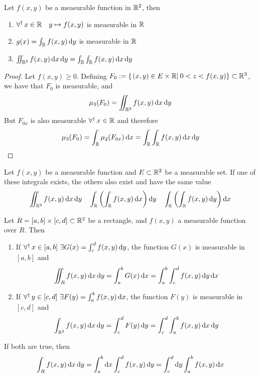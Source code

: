 \documentclass[../complete.tex]{subfiles}
\begin{document}
\begin{thm}[Fubini]
	Let $f(x,y)$ be a measurable function in $\mathbb{R}^2$, then
	\begin{enumerate}
	\item $\operatorname{\forall^\dagger} x\in\mathbb{R}\quad y\mapsto f(x,y)$ is measurable in $\mathbb{R}$
	\item $g(x)=\int_{\mathbb{R}}^{}f(x,y)\operatorname{d\!} y$ is measurable in $\mathbb{R}$
	\item $\iint_{\mathbb{R}^2}f(x,y)\operatorname{d\!} x\operatorname{d\!} y=\int_{\mathbb{R}}^{}\int_{\mathbb{R}}^{}f(x,y)\operatorname{d\!} x\operatorname{d\!} y$
	\end{enumerate}
\end{thm}
\begin{proof}
	Let $f(x,y)\ge0$. Defining $F_0:=\left\{ \left.(x,y)\in E\times\mathbb{R}\right|_{}0<z<f(x,y) \right\}\subset\mathbb{R}^3$, we have that $F_0$ is measurable, and
	\begin{equation*}
		\mu_3(F_0)=\iint_{\mathbb{R}^2}f(x,y)\operatorname{d\!} x\operatorname{d\!} y
	\end{equation*}
	But $F_{0x}$ is also measurable $\operatorname{\forall^\dagger} x\in\mathbb{R}$ and therefore
	\begin{equation*}
		\mu_3(F_0)=\int_{\mathbb{R}}\mu_2(F_{0x})\operatorname{d\!} x=\int_{\mathbb{R}}\int_{\mathbb{R}} f(x,y)\operatorname{d\!} x\operatorname{d\!} y
	\end{equation*}
\end{proof}
\begin{thm}[Tonelli]
	Let $f(x,y)$ be a measurable function and $E\subset\mathbb{R}^2$ be a measurable set. If one of these integrals exists, the others also exist and have the same value
	\begin{equation*}
		\iint_{\mathbb{R}^2}^{}f(x,y)\operatorname{d\!} x\operatorname{d\!} y\quad\int_{\mathbb{R}}^{}\left( \int_{\mathbb{R}}^{}f(x,y)\operatorname{d\!} x \right)\operatorname{d\!} y\quad\int_{\mathbb{R}}^{}\left( \int_{\mathbb{R}}^{}f(x,y)\operatorname{d\!} y \right)\operatorname{d\!} x
	\end{equation*}
\end{thm}
\begin{thm}
	Let $R=[a,b]\times[c,d]\subset\mathbb{R}^2$ be a rectangle, and $f(x,y)$ a measurable function over $R$. Then\\
	\begin{enumerate}
	\item If $\operatorname{\forall^\dagger} x\in[a,b]\ \exists G(x)=\int_{c}^{d}f(x,y)\operatorname{d\!} y$, the function $G(x)$ is measurable in $[a,b]$ and
		\begin{equation*}
			\iint_Rf(x,y)\operatorname{d\!} x\operatorname{d\!} y=\int_{a}^{b}G(x)\operatorname{d\!} x=\int_{a}^{b}\int_{c}^{d}f(x,y)\operatorname{d\!} y\operatorname{d\!} x
		\end{equation*}
	\item If $\operatorname{\forall^\dagger} y\in[c,d]\ \exists F(y)=\int_{a}^{b}f(x,y)\operatorname{d\!} x$, the function $F(y)$ is measurable in $[c,d]$ and
		\begin{equation*}
			\int_{\mathbb{R}^2}^{}f(x,y)\operatorname{d\!} x\operatorname{d\!} y=\int_{c}^{d}F(y)\operatorname{d\!} y=\int_{c}^{d}\int_{a}^{b}f(x,y)\operatorname{d\!} x\operatorname{d\!} y
		\end{equation*}
	\end{enumerate}
	If both are true, then
	\begin{equation}
		\int_{R}^{}f(x,y)\operatorname{d\!} x\operatorname{d\!} y=\int_{a}^{b}\operatorname{d\!} x\int_{c}^{d}f(x,y)\operatorname{d\!} y=\int_{c}^{d}\operatorname{d\!} y\int_{a}^{b}f(x,y)\operatorname{d\!} x
		\label{eq:rectintegration}
	\end{equation}
\end{thm}
\end{document}
